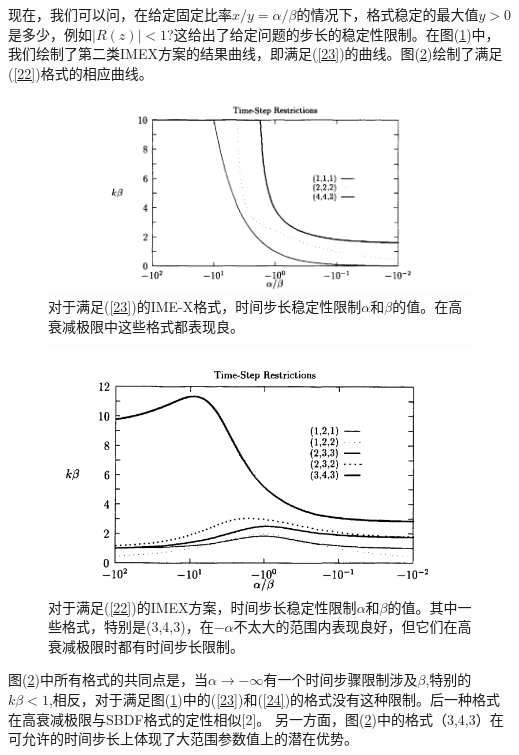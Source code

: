 \documentclass[12pt,a4paper]{article}
\begin{document}
现在，我们可以问，在给定固定比率$x/y=\alpha/\beta$的情况下，格式稳定的最大值$y> 0$是多少，例如$|R(z)|<1$?这给出了给定问题的步长的稳定性限制。在图(\ref{figures1})中，我们绘制了第二类IMEX方案的结果曲线，即满足(\ref{23})的曲线。图(\ref{figures2})绘制了满足(\ref{22})格式的相应曲线。

\begin{figure}[H]
\includegraphics[width=15cm]{./figures/1.png}
\caption{对于满足(\ref{23})的IME-X格式，时间步长稳定性限制$\alpha$和$\beta$的值。在高衰减极限中这些格式都表现良。}
\centering
\label{figures1}
\end{figure}
\begin{figure}[H]
\includegraphics[width=15cm]{./figures/2.png}
\caption{对于满足(\ref{22})的IMEX方案，时间步长稳定性限制$\alpha$和$\beta$的值。其中一些格式，特别是(3,4,3)，在$-\alpha$不太大的范围内表现良好，但它们在高衰减极限时都有时间步长限制。}
\centering
\label{figures2}
\end{figure}

图(\ref{figures2})中所有格式的共同点是，当$\alpha\to -\infty$有一个时间步骤限制涉及$\beta$,特别的$k\beta<1$,相反，对于满足图(\ref{figures1})中的(\ref{23})和(\ref{24})的格式没有这种限制。后一种格式在高衰减极限与SBDF格式的定性相似[2]。 另一方面，图(\ref{figures2})中的格式（3,4,3）在可允许的时间步长上体现了大范围参数值上的潜在优势。
\end{document}
